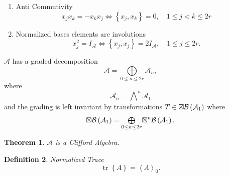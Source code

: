\documentclass[aps,preprint]{revtex4}%
\newtheorem{theorem}{Theorem}
\newtheorem{definition}[theorem]{Definition}
\begin{document}
\begin{enumerate}
\item Anti Commutivity%
\begin{equation}
x_{j}x_{k}=-x_{k}x_{j}\Longleftrightarrow\left\{  x_{j},x_{k}\right\}
=0,\quad1\leq j<k\leq2r
\end{equation}


\item Normalized bases elements are involutions
\begin{equation}
x_{j}^{2}=I_{\mathcal{A}}\Longleftrightarrow\left\{  x_{j},x_{j}\right\}
=2I_{\mathcal{A}},\quad1\leq j\leq2r.
\end{equation}

\end{enumerate}

$\mathcal{A}$ has a graded decomposition
\begin{equation}
\mathcal{A}=%
{\textstyle\bigoplus\limits_{0\leq n\leq2r}}
\mathcal{A}_{n},
\end{equation}
where
\begin{equation}
\mathcal{A}_{n}=%
{\textstyle\bigwedge\nolimits^{n}}
\mathcal{A}_{1}%
\end{equation}
and the grading is left invariant by transformations $T\in{\large \boxtimes
}\mathcal{B}\left(  \mathcal{A}_{1}\right)  $ where
\begin{equation}
{\large \boxtimes}\mathcal{B}\left(  \mathcal{A}_{1}\right)  =%
{\textstyle\bigoplus\limits_{0\leq n\leq2r}}
{\large \boxtimes}^{n}\mathcal{B}\left(  \mathcal{A}_{1}\right)  .
\end{equation}


\begin{theorem}
$\mathcal{A}$ is a Clifford Algebra.
\end{theorem}

\begin{definition}
Normalized Trace%
\begin{equation}
\operatorname*{tr}\left\{  A\right\}  =\left\langle A\right\rangle _{0}.
\end{equation}

\end{definition}
\end{document}
